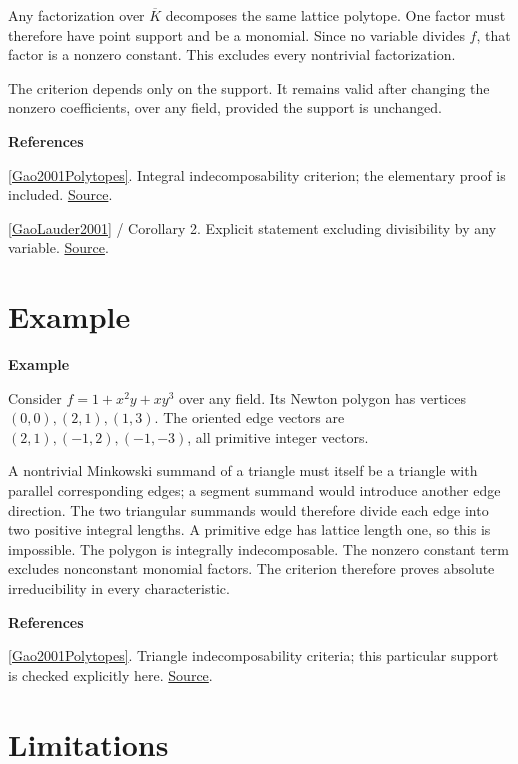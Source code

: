 \documentclass[11pt,a4paper,oneside,openany]{book}
\newenvironment{sources}{\par\smallskip\begingroup\footnotesize\color{atlasgray}\leftskip=10pt\setlength{\parskip}{2pt}}{\par\endgroup\smallskip}
\begin{document}
\begin{atlasblock}[standard]
\color{black} Any factorization over \(\overline K\) decomposes the same lattice polytope. One factor must therefore have point support and be a monomial. Since no variable divides \(f\), that factor is a nonzero constant. This excludes every nontrivial factorization.\par
\end{atlasblock}\color{black}
\color{black} The criterion depends only on the support. It remains valid after changing the nonzero coefficients, over any field, provided the support is unchanged.\par
\begin{sources}
\textbf{References}\par\smallskip
\noindent\hyperlink{ref:Gao2001Polytopes}{[Gao2001Polytopes]}. Integral indecomposability criterion; the elementary proof is included. \href{https://www.sciencedirect.com/science/article/pii/S0021869300985867}{Source}.\par
\noindent\hyperlink{ref:GaoLauder2001}{[GaoLauder2001]} / Corollary 2. Explicit statement excluding divisibility by any variable. \href{https://link.springer.com/article/10.1007/s00454-001-0024-0}{Source}.\par
\end{sources}\color{black}
\section{Example}

\begin{atlasblock}[standard]
\textbf{\sffamily Example}\par\smallskip
\color{black} Consider \(f=1+x^2y+xy^3\) over any field. Its Newton polygon has vertices \((0,0),(2,1),(1,3)\). The oriented edge vectors are \((2,1),(-1,2),(-1,-3)\), all primitive integer vectors.\par
\color{black} A nontrivial Minkowski summand of a triangle must itself be a triangle with parallel corresponding edges; a segment summand would introduce another edge direction. The two triangular summands would therefore divide each edge into two positive integral lengths. A primitive edge has lattice length one, so this is impossible. The polygon is integrally indecomposable. The nonzero constant term excludes nonconstant monomial factors. The criterion therefore proves absolute irreducibility in every characteristic.\par
\end{atlasblock}\color{black}
\begin{sources}
\textbf{References}\par\smallskip
\noindent\hyperlink{ref:Gao2001Polytopes}{[Gao2001Polytopes]}. Triangle indecomposability criteria; this particular support is checked explicitly here. \href{https://www.sciencedirect.com/science/article/pii/S0021869300985867}{Source}.\par
\end{sources}\color{black}
\section{Limitations}
\end{document}
